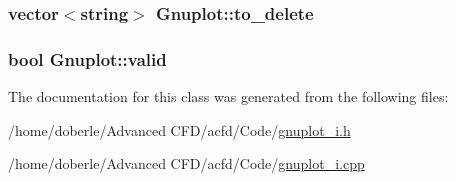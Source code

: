 \subsubsection[{\texorpdfstring{to\+\_\+delete}{to_delete}}]{\setlength{\rightskip}{0pt plus 5cm}vector$<$string$>$ Gnuplot\+::to\+\_\+delete\hspace{0.3cm}{\ttfamily [private]}}\hypertarget{class_gnuplot_a6326ff7aa2076001a4c2cf9c44b0e3db}{}\label{class_gnuplot_a6326ff7aa2076001a4c2cf9c44b0e3db}
\subsubsection[{\texorpdfstring{valid}{valid}}]{\setlength{\rightskip}{0pt plus 5cm}bool Gnuplot\+::valid\hspace{0.3cm}{\ttfamily [private]}}\hypertarget{class_gnuplot_a0155f4026915ed9b05b18c1e89ba9757}{}\label{class_gnuplot_a0155f4026915ed9b05b18c1e89ba9757}


The documentation for this class was generated from the following files\+:\begin{DoxyCompactItemize}
\item 
/home/doberle/\+Advanced C\+F\+D/acfd/\+Code/\hyperlink{gnuplot__i_8h}{gnuplot\+\_\+i.\+h}\item 
/home/doberle/\+Advanced C\+F\+D/acfd/\+Code/\hyperlink{gnuplot__i_8cpp}{gnuplot\+\_\+i.\+cpp}\end{DoxyCompactItemize}
